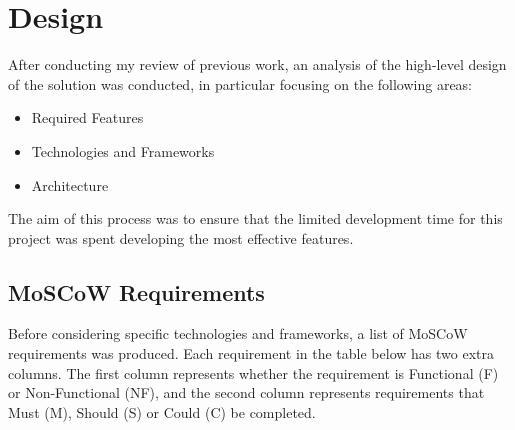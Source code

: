 \chapter{Design}
After conducting my review of previous work, an analysis of the high-level design of the solution was conducted, in particular focusing on the following areas:
\begin{itemize}
	\item Required Features
	\item Technologies and Frameworks
	\item Architecture
\end{itemize}

The aim of this process was to ensure that the limited development time for this project was spent developing the most effective features.

\section{MoSCoW Requirements}

Before considering specific technologies and frameworks, a list of MoSCoW requirements was produced. Each requirement in the table below has two extra columns. The first column represents whether the requirement is Functional (F) or Non-Functional (NF), and the second column represents requirements that Must (M), Should (S) or Could (C) be completed.

